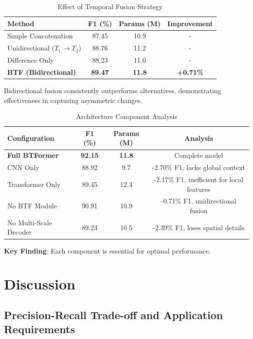 \documentclass[journal]{IEEEtran}
\begin{document}
\begin{table}[h]
\centering
\caption{Effect of Temporal Fusion Strategy}
\label{tab:ablation_fusion}
\begin{tabular}{lccc}
\toprule
\textbf{Method} & \textbf{F1 (\%)} & \textbf{Params (M)} & \textbf{Improvement} \\
\midrule
Simple Concatenation & 87.45 & 10.9 & - \\
Unidirectional ($T_1 \rightarrow T_2$) & 88.76 & 11.2 & - \\
Difference Only & 88.23 & 11.0 & - \\
\textbf{BTF (Bidirectional)} & \textbf{89.47} & \textbf{11.8} & \textbf{+0.71\%} \\
\bottomrule
\end{tabular}
\end{table}

Bidirectional fusion consistently outperforms alternatives, demonstrating effectiveness in capturing asymmetric changes.

\begin{table}[h]
\centering
\caption{Architecture Component Analysis}
\label{tab:ablation_architecture}
\begin{tabular}{lccc}
\toprule
\textbf{Configuration} & \textbf{F1 (\%)} & \textbf{Params (M)} & \textbf{Analysis} \\
\midrule
\textbf{Full BTFormer} & \textbf{92.15} & \textbf{11.8} & Complete model \\
CNN Only & 88.92 & 9.7 & -2.70\% F1, lacks global context \\
Transformer Only & 89.45 & 12.3 & -2.17\% F1, inefficient for local features \\
No BTF Module & 90.91 & 10.9 & -0.71\% F1, unidirectional fusion \\
No Multi-Scale Decoder & 89.23 & 10.5 & -2.39\% F1, loses spatial details \\
\bottomrule
\end{tabular}
\end{table}

\textbf{Key Finding}: Each component is essential for optimal performance.

\section{Discussion}

\subsection{Precision-Recall Trade-off and Application Requirements}
\end{document}
